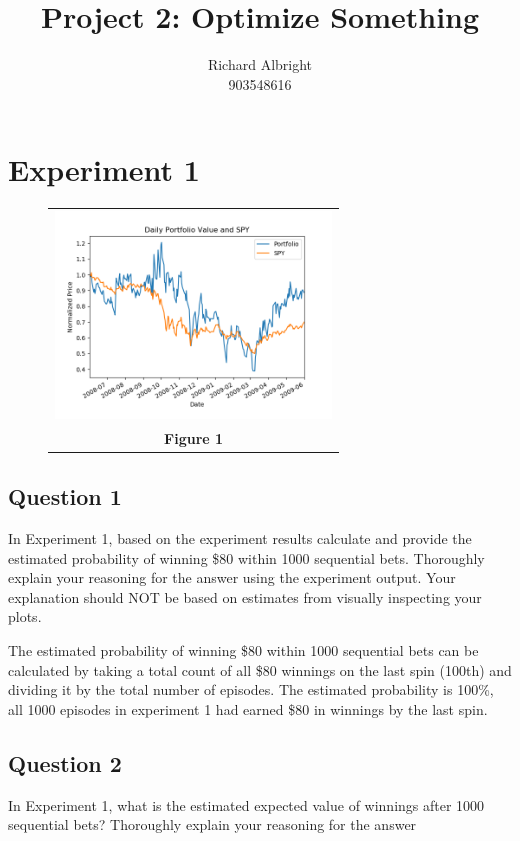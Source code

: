\documentclass[
	letterpaper, %
]{jdf}
\author{
	Richard Albright \\
	903548616}
\title{Project 2: Optimize Something}
\begin{document}

\maketitle

\section{Experiment 1}

\begin{figure}[h]
	\begin{tabular}{c}
		\includegraphics[height=5.5cm]{figure1.png} \\
		\textbf{Figure 1} \\
		
	\end{tabular}
\end{figure}


\subsection{Question 1}
In Experiment 1, based on the experiment results calculate and provide the estimated probability of winning \$80 within 1000 sequential bets. Thoroughly explain your reasoning for the answer using the experiment output. Your explanation should NOT be based on estimates from visually inspecting your plots. 

The estimated probability of winning \$80 within 1000 sequential bets can be calculated by taking a total count of all \$80 winnings on the last spin (100th) and dividing it by the total number of episodes. The estimated probability is 100\%, all 1000 episodes in experiment 1 had earned \$80 in winnings by the last spin.


\subsection{Question 2}
In Experiment 1, what is the estimated expected value of winnings after 1000 sequential bets? Thoroughly explain your reasoning for the answer
\end{document}
